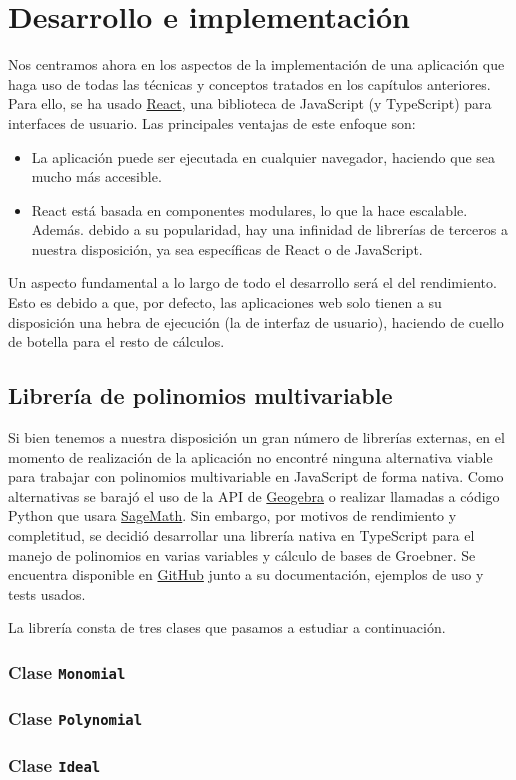 
\chapter{Desarrollo e implementación}
Nos centramos ahora en los aspectos de la implementación de una aplicación que haga uso de todas las técnicas y conceptos tratados en los capítulos anteriores. Para ello, se ha usado \href{https://es.reactjs.org/}{React}, una biblioteca de JavaScript (y TypeScript) para interfaces de usuario. Las principales ventajas de este enfoque son:
\begin{itemize}
    \item La aplicación puede ser ejecutada en cualquier navegador, haciendo que sea mucho más accesible.
    \item React está basada en componentes modulares, lo que la hace escalable. Además. debido a su popularidad, hay una infinidad de librerías de terceros a nuestra disposición, ya sea específicas de React o de JavaScript.
\end{itemize}

Un aspecto fundamental a lo largo de todo el desarrollo será el del rendimiento. Esto es debido a que, por defecto, las aplicaciones web solo tienen a su disposición una hebra de ejecución (la de interfaz de usuario), haciendo de cuello de botella para el resto de cálculos.

\section{Librería de polinomios multivariable}
Si bien tenemos a nuestra disposición un gran número de librerías externas, en el momento de realización de la aplicación no encontré ninguna alternativa viable para trabajar con polinomios multivariable en JavaScript de forma nativa. Como alternativas se barajó el uso de la API de \href{https://wiki.geogebra.org/en/Reference:GeoGebra_Apps_API}{Geogebra} o realizar llamadas a código Python que usara \href{https://www.sagemath.org/}{SageMath}. Sin embargo, por motivos de rendimiento y completitud, se decidió desarrollar una librería nativa en TypeScript para el manejo de polinomios en varias variables y cálculo de bases de Groebner. Se encuentra disponible en \href{https://github.com/Daniel2000815/multivariate-polynomial}{GitHub} junto a su documentación, ejemplos de uso y tests usados.\newline

La librería consta de tres clases que pasamos a estudiar a continuación.

\subsection{Clase \texttt{Monomial}}

\subsection{Clase \texttt{Polynomial}}

\subsection{Clase \texttt{Ideal}}
